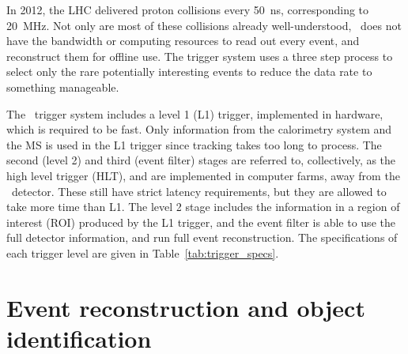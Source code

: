 In 2012, the LHC delivered proton collisions every 50~ns, corresponding to
20~MHz.
Not only are most of these collisions already well-understood, \atlas\ does not
have the bandwidth or computing resources to read out every event, and
reconstruct them for offline use.
The trigger system uses a three step process to select only the rare
potentially interesting events to reduce the data rate to something manageable.

The \atlas\ trigger system includes a level 1 (L1) trigger, implemented in
hardware, which is required to be fast.
Only information from the calorimetry system and the MS is used in the L1
trigger since tracking takes too long to process.
The second (level 2) and third (event filter) stages are referred to,
collectively, as the high level trigger (HLT), and are implemented in computer
farms, away from the \atlas\ detector.
These still have strict latency requirements, but they are allowed to take
more time than L1.
The level 2 stage includes the information in a region of interest (ROI)
produced by the L1 trigger, and the event filter is able to use the full
detector information, and run full event reconstruction.
The specifications of each trigger level are given in
Table~\ref{tab:trigger_specs}.

\begin{table}[ht]
  \caption{
    Specifications of the three levels of the \atlas\ trigger system.
  }
  \label{tab:trigger_specs}
\end{table}

\FloatBarrier
\section{Event reconstruction and object identification}
\label{sec:event_reco}

